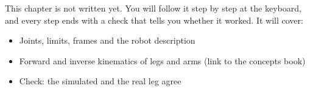 \label{k:model}
\begin{keyidea}
This chapter is not written yet. You will follow it step by step at the keyboard, and every step ends with a check that tells you whether it worked. It will cover:
\begin{itemize}[nosep]
  \item Joints, limits, frames and the robot description
  \item Forward and inverse kinematics of legs and arms (link to the concepts book)
  \item Check: the simulated and the real leg agree
\end{itemize}
\end{keyidea}
